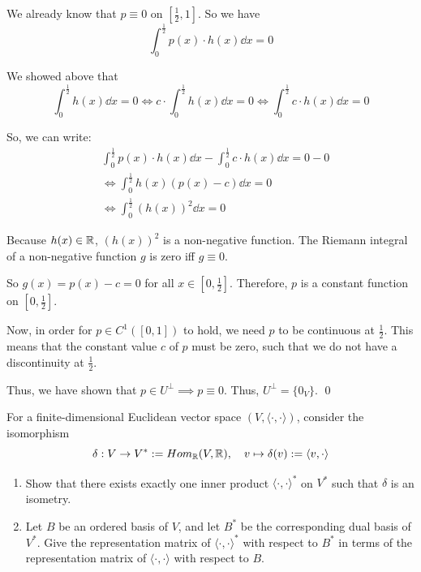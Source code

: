 \documentclass[12pt]{article}
\begin{document}
\begin{enumerate}[label=\alph*)]
    We already know that $p \equiv 0$ on $[\frac{1}{2}, 1]$. So we have
    $$
        \int_0^{\frac{1}{2}} p(x) \cdot h(x) \dd x  = 0
    $$

    We showed above that 
    $$
        \int_0^{\frac{1}{2}} h(x) \dd x = 0 \iff c \cdot \int_0^{\frac{1}{2}} h(x) \dd x = 0 \iff \int_0^{\frac{1}{2}} c\cdot h(x) \dd x = 0
    $$

    So, we can write:
    $$
    \begin{aligned}
        &\int_0^{\frac{1}{2}} p(x) \cdot h(x) \dd x - \int_0^{\frac{1}{2}} c\cdot h(x) \dd x = 0 - 0 \\
        &\iff \int_0^{\frac{1}{2}} h(x) \left( p(x) - c \right) \dd x = 0 \\
        &\iff \int_0^{\frac{1}{2}} (h(x))^2 \dd x = 0
    \end{aligned}
    $$

    Because $h(x) \in \mathbb{R}$, $(h(x))^2$ is a non-negative function. The Riemann integral of a non-negative function $g$ is zero iff $g \equiv 0$.

    So $g(x) = p(x) - c = 0$ for all $x \in [0, \frac{1}{2}]$. Therefore, $p$ is a constant function on $[0, \frac{1}{2}]$.
    
    Now, in order for $p \in C^1([0, 1])$ to hold, we need $p$ to be continuous at $\frac{1}{2}$. This means that the constant value $c$ of $p$ must be zero, such that we do not have a discontinuity at $\frac{1}{2}$.

    Thus, we have shown that $p \in U^\perp \implies p \equiv 0$. Thus, $U^\perp = \{0_V\}$. \qed

\end{enumerate}

\begin{problem}{}{}
    For a finite-dimensional Euclidean vector space $(V, \langle \cdot, \cdot \rangle)$, consider the isomorphism
    $$
        \delta: V \rightarrow V^* := Hom_{\mathbb{R}}(V,\mathbb{R}),\quad v \mapsto \delta(v) := \langle v, \cdot \rangle
    $$

    \begin{enumerate}[label=\alph*)]
        \item Show that there exists exactly one inner product $\langle \cdot, \cdot \rangle^*$ on $V^*$ such that $\delta$ is an isometry.
        \item Let $B$ be an ordered basis of $V$, and let $B^*$ be the corresponding dual basis of $V^*$. Give the representation matrix of $\langle \cdot, \cdot \rangle^*$ with respect to $B^*$ in terms of the representation matrix of $\langle \cdot, \cdot \rangle$ with respect to $B$.
    \end{enumerate}
\end{problem}
\end{document}
